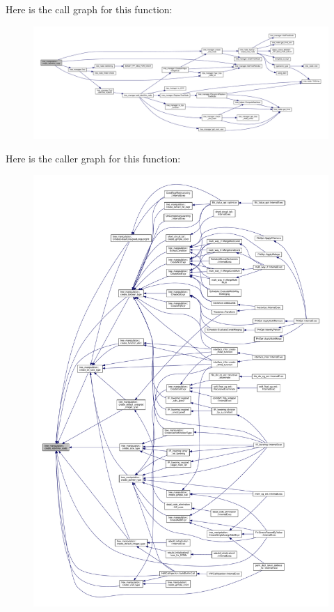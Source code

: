 Here is the call graph for this function\+:
\nopagebreak
\begin{figure}[H]
\begin{center}
\leavevmode
\includegraphics[width=350pt]{d0/d99/classtree__manipulation_a5bfe50679122b1dc8fc2730c26ff9f71_cgraph}
\end{center}
\end{figure}
Here is the caller graph for this function\+:
\nopagebreak
\begin{figure}[H]
\begin{center}
\leavevmode
\includegraphics[width=350pt]{d0/d99/classtree__manipulation_a5bfe50679122b1dc8fc2730c26ff9f71_icgraph}
\end{center}
\end{figure}
\mbox{\label{classtree__manipulation_a6ad2c7fadb2f6cdba0adc41e61863dbf}} 
